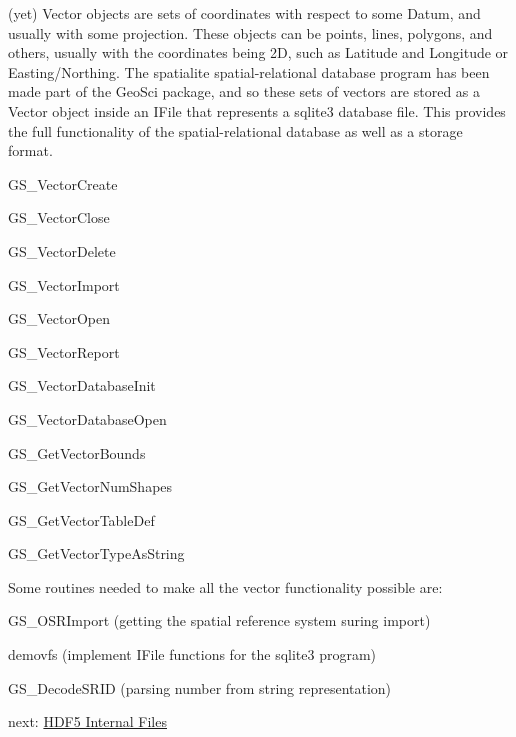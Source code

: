 (yet) Vector objects are sets of coordinates with respect to some Datum, and usually with some projection. These objects can be points, lines, polygons, and others, usually with the coordinates being 2\+D, such as Latitude and Longitude or Easting/\+Northing. The {\ttfamily spatialite} spatial-\/relational database program has been made part of the Geo\+Sci package, and so these sets of vectors are stored as a Vector object inside an I\+File that represents a {\ttfamily sqlite3} database file. This provides the full functionality of the spatial-\/relational database as well as a storage format. \begin{DoxyItemize}
\item G\+S\+\_\+\+Vector\+Create \item G\+S\+\_\+\+Vector\+Close \item G\+S\+\_\+\+Vector\+Delete \item G\+S\+\_\+\+Vector\+Import \item G\+S\+\_\+\+Vector\+Open \item G\+S\+\_\+\+Vector\+Report \item G\+S\+\_\+\+Vector\+Database\+Init \item G\+S\+\_\+\+Vector\+Database\+Open \item G\+S\+\_\+\+Get\+Vector\+Bounds \item G\+S\+\_\+\+Get\+Vector\+Num\+Shapes \item G\+S\+\_\+\+Get\+Vector\+Table\+Def \item G\+S\+\_\+\+Get\+Vector\+Type\+As\+String\end{DoxyItemize}
Some routines needed to make all the vector functionality possible are\+: \begin{DoxyItemize}
\item G\+S\+\_\+\+O\+S\+R\+Import (getting the spatial reference system suring import) \item demovfs (implement I\+File functions for the sqlite3 program) \item G\+S\+\_\+\+Decode\+S\+R\+I\+D (parsing number from string representation)\end{DoxyItemize}
next\+: \hyperlink{ifile_library}{H\+D\+F5 Internal Files} 